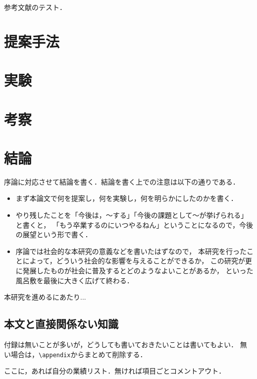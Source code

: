 \documentclass[book,paper=a4,fontsize=10pt,jafontscale=0.92]{jlreq}
\begin{document}
参考文献\cite{Kameyama92,Favalora02,Tachi15}のテスト．

\chapter{提案手法}

\chapter{実験}

\chapter{考察}

\chapter{結論}

序論に対応させて結論を書く．結論を書く上での注意は以下の通りである．
\begin{itemize}
 \item まず本論文で何を提案し，何を実験し，何を明らかにしたのかを書く．
 \item やり残したことを「今後は，〜する」「今後の課題として〜が挙げられる」と書くと，
       「もう卒業するのにいつやるねん」ということになるので，今後の展望という形で書く．
 \item 序論では社会的な本研究の意義などを書いたはずなので，
       本研究を行ったことによって，どういう社会的な影響を与えることができるか，
       この研究が更に発展したものが社会に普及するとどのようなよいことがあるか，
       といった風呂敷を最後に大きく広げて終わる．
\end{itemize}


\acknowledgements

本研究を進めるにあたり...








\appendix

\section{本文と直接関係ない知識}

付録は無いことが多いが，どうしても書いておきたいことは書いてもよい．
無い場合は，\verb|\appendix|からまとめて削除する．


\papers %

ここに，あれば自分の業績リスト．無ければ項目ごとコメントアウト．
\end{document}
